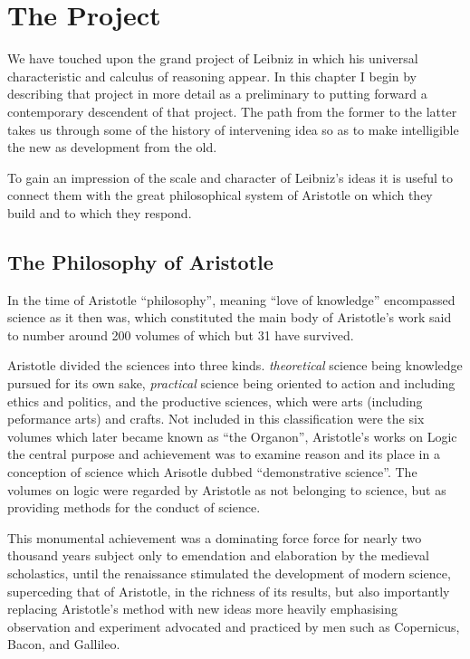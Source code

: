 
\chapter{The Project}\label{TheProject}

We have touched upon the grand project of Leibniz in which his universal characteristic
and calculus of reasoning appear.
In this chapter I begin by describing that project in more detail as a preliminary
to putting forward a contemporary descendent of that project.
The path from the former to the latter takes us through some of the history of
intervening idea so as to make intelligible the new as development from the old.

To gain an impression of the scale and character of Leibniz's ideas it is useful to connect them with
the great philosophical system of Aristotle on which they build and to which they respond.

\section{The Philosophy of Aristotle}

In the time of Aristotle ``philosophy'', meaning ``love of knowledge'' encompassed science as
it then was, which constituted the main body of Aristotle's work said to number around 200 volumes
of which but 31 have survived.

Aristotle divided the sciences into three kinds.
\emph{theoretical} science being knowledge pursued for 
its own sake, \emph{practical} science being oriented to action and including ethics and politics, and
the productive sciences, which were arts (including peformance arts) and crafts.
Not included in this classification were the six volumes which later became known as ``the Organon'', Aristotle's
works on Logic the central purpose and achievement was to examine reason and its place in a conception of
science which Arisotle dubbed ``demonstrative science''.
The volumes on logic were regarded by Aristotle as not belonging to science, but as providing
methods for the conduct of science.

This monumental achievement was a dominating force force for nearly two thousand years
subject only to emendation and elaboration by the medieval scholastics, until the renaissance
stimulated the development of modern science, superceding that of Aristotle, in the richness
of its results, but also importantly replacing Aristotle's method with new ideas more heavily
emphasising observation and experiment advocated and practiced by men such as Copernicus, Bacon,
and Gallileo.

